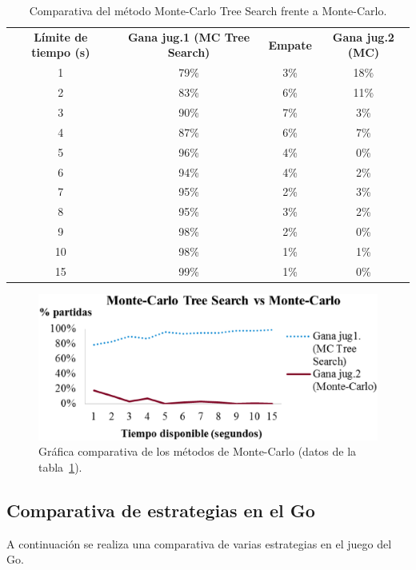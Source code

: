 \begin{table}[!h]
\centering
\caption[Comparativa de los métodos de Monte-Carlo (II)]{Comparativa del método Monte-Carlo Tree Search frente a Monte-Carlo.}
\label{tab:comparativa_montecarlo2}
\begin{tabular}{cccc}
\hline
\textbf{Límite de tiempo (s)} & \textbf{Gana jug.1 (MC Tree Search)} & \textbf{Empate} & \textbf{Gana jug.2 (MC)}\\
1 & 79\% &	3\% &	18\% \\
2 & 83\% &	6\% &	11\% \\
3 & 90\% &	7\% &	3\% \\
4 & 87\% &	6\% &	7\% \\
5 & 96\% &	4\% &	0\% \\
6 & 94\% &	4\% &	2\% \\
7 & 95\% &	2\% &	3\% \\
8 & 95\% &	3\% &	2\% \\
9 & 98\% &	2\% &	0\% \\
10 & 98\% &	1\% &	1\% \\
15 & 99\%	& 1\%	 & 0\% \\
\hline
\end{tabular}
\end{table} 

\begin{figure}[!h]
	\centering
	\includegraphics[scale=0.4]{contenido/cap7/imagenes/montecarlo2.eps}
	\caption[Comparativa de los métodos de Monte-Carlo (I)]{Gráfica comparativa de los métodos de Monte-Carlo (datos de la tabla~\ref{tab:comparativa_montecarlo2}).}
	\label{fig:comparativa_montecarlo2}
\end{figure} 


\subsection{Comparativa de estrategias en el Go}
\label{ssec:comparativa_estrategias_go}
A continuación se realiza una comparativa de varias estrategias en el juego del Go.

